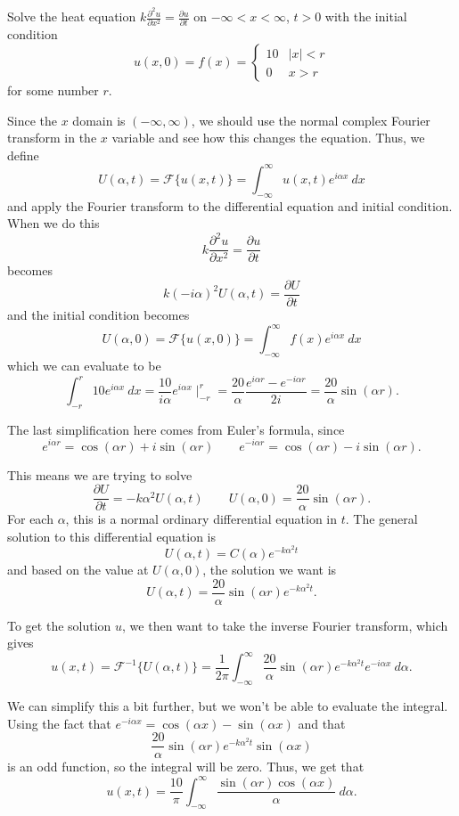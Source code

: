 \begin{example}
Solve the heat equation $ k \frac{\partial^2 u}{\partial x^2} = \frac{\partial u}{\partial t}$ on $-\infty < x < \infty$, $t >0$ with the initial condition
\[ u(x, 0) = f(x) = \begin{cases}
10 & |x| < r \\ 
0 & x > r
\end{cases} \] for some number $r$. 
\end{example}

\begin{exampleSol}
Since the $x$ domain is $(-\infty, \infty)$, we should use the normal complex Fourier transform in the $x$ variable and see how this changes the equation. Thus, we define
\[ U(\alpha, t) = \mathcal{F}\{u(x, t)\} = \int_{-\infty}^\infty u(x,t)e^{i \alpha x}\ dx \] and apply the Fourier transform to the differential equation and initial condition. When we do this
\[ k \frac{\partial^2 u}{\partial x^2} = \frac{\partial u}{\partial t} \] becomes
\[ k(-i \alpha)^2 U(\alpha, t) = \frac{\partial U}{\partial t} \] and the initial condition becomes
\[ U(\alpha, 0) = \mathcal{F}\{u(x, 0)\} = \int_{-\infty}^\infty f(x)e^{i\alpha x}\ dx \] which we can evaluate to be
\[ \int_{-r}^r 10e^{i\alpha x}\ dx = \frac{10}{i\alpha}e^{i\alpha x}\mid_{-r}^r = \frac{20}{\alpha} \frac{e^{i\alpha r} - e^{-i\alpha r}}{2i} = \frac{20}{\alpha}\sin(\alpha r). \]

The last simplification here comes from Euler's formula, since
\[ e^{i\alpha r} = \cos(\alpha r) + i\sin(\alpha r) \qquad e^{-i\alpha r} = \cos(\alpha r) - i\sin(\alpha r). \]

This means we are trying to solve
\[ \frac{\partial U}{\partial t} = -k\alpha^2 U(\alpha, t) \qquad U(\alpha, 0) = \frac{20}{\alpha}\sin(\alpha r). \] For each $\alpha$, this is a normal ordinary differential equation in $t$. The general solution to this differential equation is
\[ U(\alpha, t) = C(\alpha)e^{-k\alpha^2 t} \] and based on the value at $U(\alpha, 0)$, the solution we want is
\[U(\alpha, t) = \frac{20}{\alpha} \sin(\alpha r)e^{-k\alpha^2 t}. \]

To get the solution $u$, we then want to take the inverse Fourier transform, which gives
\[ u(x,t) = \mathcal{F}^{-1}\{U(\alpha, t)\} = \frac{1}{2\pi} \int_{-\infty}^\infty \frac{20}{\alpha} \sin(\alpha r)e^{-k\alpha^2 t} e^{-i\alpha x}\ d\alpha. \]

We can simplify this a bit further, but we won't be able to evaluate the integral. Using the fact that $e^{-i\alpha x} = \cos(\alpha x) - \sin(\alpha x)$ and that
\[ \frac{20}{\alpha} \sin(\alpha r)e^{-k\alpha^2 t} \sin(\alpha x) \] is an odd function, so the integral will be zero. Thus, we get that
\[ u(x,t) = \frac{10}{\pi} \int_{-\infty}^\infty \frac{\sin(\alpha r)\cos(\alpha x)}{\alpha}\ d\alpha. \]
\end{exampleSol}

